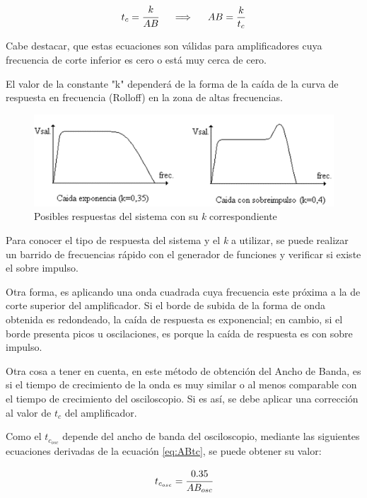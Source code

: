 \begin{equation}
    t_c = \cfrac{k}{AB}
    \hspace{0.5cm}\Longrightarrow\hspace{0.5cm}
    AB = \frac{k}{t_c}
    \label{eq:ABtc}
\end{equation}

Cabe destacar, que estas ecuaciones son válidas para amplificadores cuya frecuencia de corte inferior es cero o está muy cerca de cero. 

El valor de la constante "k" dependerá de la forma de la caída de la curva de respuesta en frecuencia (Rolloff) en la zona de altas frecuencias.

\begin{figure}[H]
    \centering
    \includegraphics[width=0.87\linewidth]{Imagenes/constK.png}
    \caption{Posibles respuestas del sistema con su \textit{k} correspondiente}
    \label{fig:constk}
\end{figure}

Para conocer el tipo de respuesta del sistema y el \textit{k} a utilizar, se puede realizar un barrido de frecuencias rápido con el generador de funciones y verificar si existe el sobre impulso.

Otra forma, es aplicando una onda cuadrada cuya frecuencia este próxima a la de corte superior del amplificador. Si el borde de subida de la forma de onda obtenida es redondeado, la caída de respuesta es exponencial; en cambio, si el borde presenta picos u oscilaciones, es porque la caída de respuesta es con sobre impulso.

Otra cosa a tener en cuenta, en este método de obtención del Ancho de Banda, es si el tiempo de crecimiento de la onda es muy similar o al menos comparable con el tiempo de crecimiento del osciloscopio. Si es así, se debe aplicar una corrección al valor de $t_c$ del amplificador. 

Como el $t_{c_{osc}}$ depende del ancho de banda del osciloscopio, mediante las siguientes ecuaciones derivadas de la ecuación \ref{eq:ABtc}, se puede obtener su valor:

\begin{equation}
    t_{c_{osc}} = \cfrac{0.35}{AB_{osc}}
    \label{eq:tc_osc}
\end{equation}

